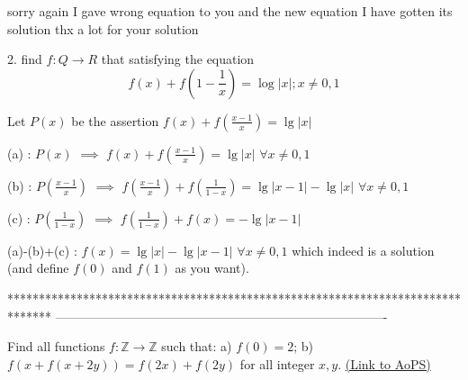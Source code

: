 


\begin{solution}
	sorry again I gave wrong equation to you
and the new equation I have gotten its solution
thx a lot for your solution
\end{solution}



\begin{solution}
	\begin{tcolorbox}2. find $f:Q\rightarrow R$ that satisfying the equation
\[f(x)+f(1-\frac{1}{x})=\log |x|;x\not=0,1\]\end{tcolorbox}
Let $P(x)$ be the assertion $f(x)+f(\frac{x-1}x)=\lg|x|$

(a) : $P(x)$ $\implies$ $f(x)+f(\frac{x-1}x)=\lg|x|$ $\forall x\ne 0,1$

(b) : $P(\frac{x-1}x)$ $\implies$ $f(\frac{x-1}x)+f(\frac 1{1-x})=\lg|x-1|-\lg|x|$ $\forall x\ne 0,1$

(c) : $P(\frac 1{1-x})$ $\implies$ $f(\frac 1{1-x})+f(x)=-\lg|x-1|$

(a)-(b)+(c) : $\boxed{f(x)=\lg|x|-\lg|x-1|}$ $\forall x\ne 0,1$ which indeed is a solution (and define $f(0)$ and $f(1)$ as you want).
\end{solution}
*******************************************************************************
-------------------------------------------------------------------------------

\begin{problem}
	Find all functions $f: \mathbb{Z}\to \mathbb{Z}$ such that:
a) $f(0)=2$;
b) $f(x+f(x+2y))=f(2x)+f(2y)$ for all integer $x,y$.
	\flushright \href{https://artofproblemsolving.com/community/c6h471949}{(Link to AoPS)}
\end{problem}



